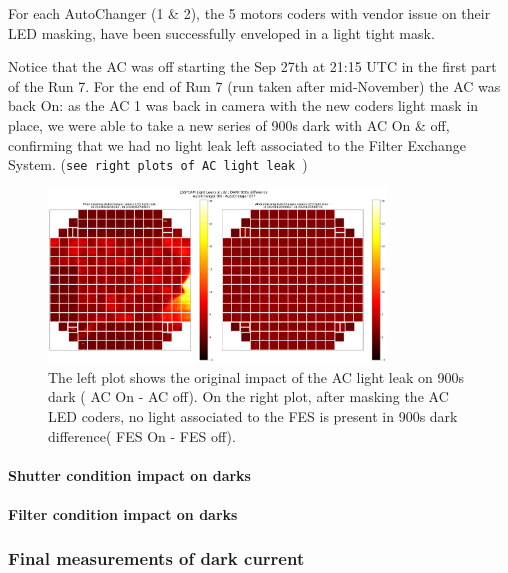 For each AutoChanger (1 \& 2), the 5 motors coders with vendor issue on
their LED masking, have been successfully enveloped in a light tight
mask.

Notice that the AC was off starting the Sep 27th at 21:15 UTC in the
first part of the Run 7. For the end of Run 7 (run taken after
mid-November) the AC was back On: as the AC 1 was back in camera with
the new coders light mask in place, we were able to take a new series of
900s dark with AC On \& off, confirming that we had no light leak left
associated to the Filter Exchange System.
(\texttt{see\ right\ plots\ of\ AC\ light\ leak\ })

\begin{figure}
\begin{centering}
\includegraphics[width=0.8\textwidth]{sections/figures/AC_LightLeak_study.png}
\caption{ The left plot shows the original impact of the AC light leak on 900s dark ( AC On - AC off). On the right plot, after masking the AC LED coders, no light associated to the FES is present in 900s dark difference( FES On - FES off).  \label{fig-ac-light-leak}}
\end{centering}
\end{figure}

\paragraph{Shutter condition impact on
darks}\label{shutter-condition-impact-on-darks}

\paragraph{Filter condition impact on
darks}\label{filter-condition-impact-on-darks}

\subsubsection{Final measurements of dark
current}\label{final-measurements-of-dark-current}

